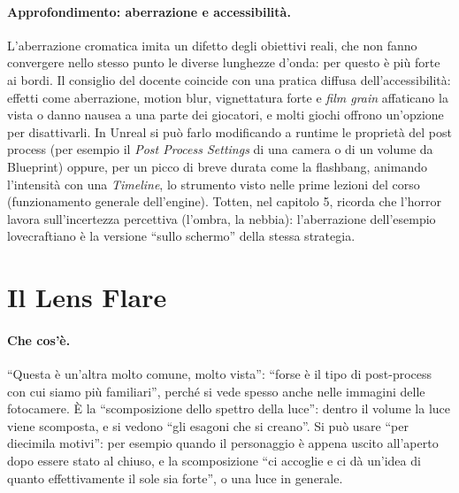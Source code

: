 \paragraph{Approfondimento: aberrazione e accessibilità.} L'aberrazione cromatica imita un
difetto degli obiettivi reali, che non fanno convergere nello stesso punto le diverse
lunghezze d'onda: per questo è più forte ai bordi. Il consiglio del docente coincide con una
pratica diffusa dell'accessibilità: effetti come aberrazione, motion blur, vignettatura forte e
\emph{film grain} affaticano la vista o danno nausea a una parte dei giocatori, e molti giochi
offrono un'opzione per disattivarli. In Unreal si può farlo modificando a runtime le proprietà
del post process (per esempio il \emph{Post Process Settings} di una camera o di un volume da
Blueprint) oppure, per un picco di breve durata come la flashbang, animando l'intensità con una
\emph{Timeline}, lo strumento visto nelle prime lezioni del corso (funzionamento generale
dell'engine). Totten, nel capitolo 5, ricorda che l'horror lavora sull'incertezza percettiva
(l'ombra, la nebbia): l'aberrazione dell'esempio lovecraftiano è la versione
``sullo schermo'' della stessa strategia.

\section{Il Lens Flare}
\label{ue16:sec:flare}

\paragraph{Che cos'è.} ``Questa è un'altra molto comune, molto vista'': ``forse è il tipo di
post-process con cui siamo più familiari'', perché si vede spesso anche nelle immagini delle
fotocamere. È la ``scomposizione dello spettro della luce'': dentro il volume la luce viene
scomposta, e si vedono ``gli esagoni che si creano''. Si può usare ``per diecimila motivi'':
per esempio quando il personaggio è appena uscito all'aperto dopo essere stato al chiuso, e la
scomposizione ``ci accoglie e ci dà un'idea di quanto effettivamente il sole sia forte'', o una
luce in generale.

